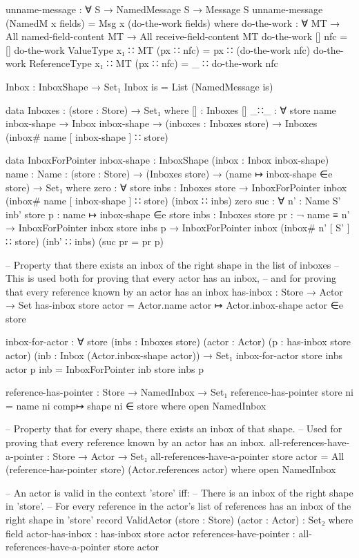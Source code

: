 \begin{code}
unname-message : ∀ {S} → NamedMessage S → Message S
unname-message (NamedM x fields) = Msg x (do-the-work fields)
  where
    do-the-work : ∀ {MT} → All named-field-content MT → All receive-field-content MT
    do-the-work {[]} nfc = []
    do-the-work {ValueType x₁ ∷ MT} (px ∷ nfc) = px ∷ (do-the-work nfc)
    do-the-work {ReferenceType x₁ ∷ MT} (px ∷ nfc) = _ ∷ do-the-work nfc

Inbox : InboxShape → Set₁
Inbox is = List (NamedMessage is)

data Inboxes : (store : Store) → Set₁ where
  [] : Inboxes []
  _∷_ : ∀ {store name inbox-shape} → Inbox inbox-shape →
    (inboxes : Inboxes store) → Inboxes (inbox# name [ inbox-shape ] ∷ store)

data InboxForPointer {inbox-shape : InboxShape} (inbox : Inbox inbox-shape) {name : Name} : (store : Store) → (Inboxes store) → (name ↦ inbox-shape ∈e store) → Set₁ where
  zero : ∀ {store} {inbs : Inboxes store} →
         InboxForPointer inbox (inbox# name [ inbox-shape ] ∷ store) (inbox ∷ inbs) zero
  suc : ∀ {n' : Name} {S' inb' store} {p : name ↦ inbox-shape ∈e store} {inbs : Inboxes store} {pr : ¬ name ≡ n'} →
        InboxForPointer inbox store inbs p →
        InboxForPointer inbox (inbox# n' [ S' ] ∷ store) (inb' ∷ inbs) (suc {pr = pr} p)

-- Property that there exists an inbox of the right shape in the list of inboxes
-- This is used both for proving that every actor has an inbox,
-- and for proving that every reference known by an actor has an inbox
has-inbox : Store → Actor → Set
has-inbox store actor = Actor.name actor ↦ Actor.inbox-shape actor ∈e store


inbox-for-actor : ∀ {store} (inbs : Inboxes store) (actor : Actor) (p : has-inbox store actor) (inb : Inbox (Actor.inbox-shape actor)) → Set₁
inbox-for-actor {store} inbs actor p inb = InboxForPointer inb store inbs p

reference-has-pointer : Store → NamedInbox → Set₁
reference-has-pointer store ni = name ni comp↦ shape ni ∈ store
  where open NamedInbox

-- Property that for every shape, there exists an inbox of that shape.
-- Used for proving that every reference known by an actor has an inbox.
all-references-have-a-pointer : Store → Actor → Set₁
all-references-have-a-pointer store actor = All (reference-has-pointer store) (Actor.references actor)
  where open NamedInbox

-- An actor is valid in the context 'store' iff:
-- There is an inbox of the right shape in 'store'.
-- For every reference in the actor's list of references has an inbox of the right shape in 'store'
record ValidActor (store : Store) (actor : Actor) : Set₂ where
  field
    actor-has-inbox : has-inbox store actor
    references-have-pointer : all-references-have-a-pointer store actor


\end{code}

